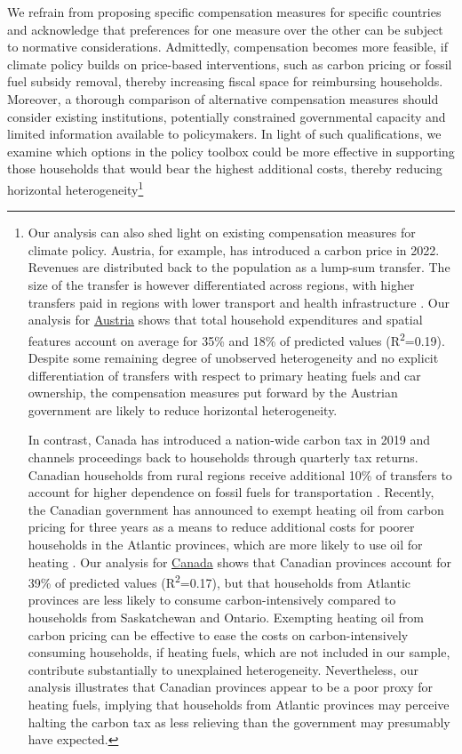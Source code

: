 \documentclass[12pt, a4paper]{article}
\begin{document}
We refrain from proposing specific compensation measures for specific countries and acknowledge that preferences for one measure over the other can be subject to normative considerations. Admittedly, compensation becomes more feasible, if climate policy builds on price-based interventions, such as carbon pricing or fossil fuel subsidy removal, thereby increasing fiscal space for reimbursing households. Moreover, a thorough comparison of alternative compensation measures should consider existing institutions, potentially constrained governmental capacity and limited information available to policymakers. In light of such qualifications, we examine which options in the policy toolbox could be more effective in supporting those households that would bear the highest additional costs, thereby reducing horizontal heterogeneity\footnote{Our analysis can also shed light on existing compensation measures for climate policy. Austria, for example, has introduced a carbon price in 2022. Revenues are distributed back to the population as a lump-sum transfer. The size of the transfer is however differentiated across regions, with higher transfers paid in regions with lower transport and health infrastructure \autocite{BMK.2023}. Our analysis for \hyperref[fig:5b_AUT]{Austria} shows that total household expenditures and spatial features account on average for 35\% and 18\% of predicted values (R\textsuperscript{2}=0.19). Despite some remaining degree of unobserved heterogeneity and no explicit differentiation of transfers with respect to primary heating fuels and car ownership, the compensation measures put forward by the Austrian government are likely to reduce horizontal heterogeneity.

In contrast, Canada has introduced a nation-wide carbon tax in 2019 and channels proceedings back to households through quarterly tax returns. Canadian households from rural regions receive additional 10\% of transfers to account for higher dependence on fossil fuels for transportation \autocite{GovernmentofCanada.2023}. Recently, the Canadian government has announced to exempt heating oil from carbon pricing for three years as a means to reduce additional costs for poorer households in the Atlantic provinces, which are more likely to use oil for heating \autocite{Reuters.2023}. Our analysis for \hyperref[fig:5b_CAN]{Canada} shows that Canadian provinces account for 39\% of predicted values (R\textsuperscript{2}=0.17), but that households from Atlantic provinces are less likely to consume carbon-intensively compared to households from Saskatchewan and Ontario. Exempting heating oil from carbon pricing can be effective to ease the costs on carbon-intensively consuming households, if heating fuels, which are not included in our sample, contribute substantially to unexplained heterogeneity. Nevertheless, our analysis illustrates that Canadian provinces appear to be a poor proxy for heating fuels, implying that households from Atlantic provinces may perceive halting the carbon tax as less relieving than the government may presumably have expected.}
\end{document}
